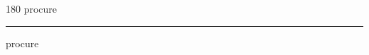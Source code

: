 
\begin{frame}
\begin{center}
\begin{turn}{180}
{\fontsize{2.5cm}{1em}\selectfont procure}
\end{turn}
\vspace{1em}\par  
\hrule
\vspace{1em}\par  
{\fontsize{2.5cm}{1em}\selectfont procure}
\end{center}
\end{frame}
